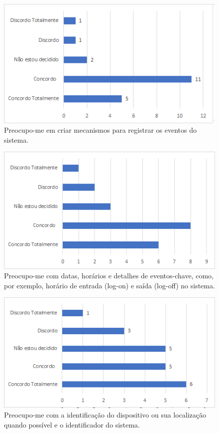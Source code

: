 \begin{figure}[!t]
\centering
\includegraphics[scale=0.7]{figuras das questoes/5.1.png}
\caption{Preocupo-me em criar mecanismos para registrar os eventos do sistema.}
\end{figure}

\begin{figure}[!t]
\centering
\includegraphics[scale=0.7]{figuras das questoes/5.2.png}
\caption{Preocupo-me com datas, horários e detalhes de eventos-chave, como, por exemplo, horário de entrada (log-on) e saída (log-off) no sistema.}
\end{figure}

\begin{figure}[!t]
\centering
\includegraphics[scale=0.7]{figuras das questoes/5.3.png}
\caption{Preocupo-me com a identificação do dispositivo ou sua localização quando possível e o identificador do sistema.}
\end{figure}

